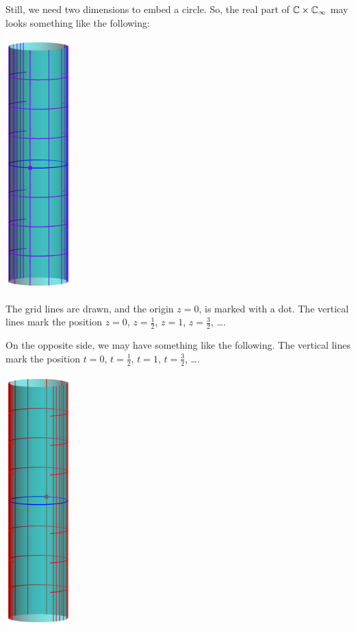 Still, we need two dimensions to embed a circle. So, the real part of $\mathbb C \times \mathbb C_\infty$ may
looks something like the following:
\begin{center}
	\includegraphics{3dfigures/pdf/CxCinf.pdf}
\end{center}

The grid lines are drawn, and the origin $z = 0$, is marked with a dot.
The vertical lines mark the position $z = 0$, $z = \frac{1}{2}$, $z = 1$, $z = \frac{3}{2}$, \dots.

On the opposite side, we may have something like the following.
The vertical lines mark the position $t = 0$, $t = \frac{1}{2}$, $t = 1$, $t = \frac{3}{2}$, \dots.
\begin{center}
	\includegraphics{3dfigures/pdf/CxCinf2.pdf}
\end{center}

